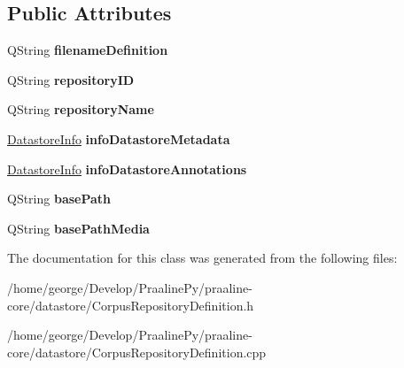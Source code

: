 \subsection*{Public Attributes}
\begin{DoxyCompactItemize}
\item 
\mbox{\label{class_corpus_repository_definition_a4ac448aed041a154050f249672b001c0}} 
Q\+String {\bfseries filename\+Definition}
\item 
\mbox{\label{class_corpus_repository_definition_a811880cb773368317e6aab2245bc2a28}} 
Q\+String {\bfseries repository\+ID}
\item 
\mbox{\label{class_corpus_repository_definition_a5c6950346754c8a150230ac1ce237e0f}} 
Q\+String {\bfseries repository\+Name}
\item 
\mbox{\label{class_corpus_repository_definition_afc1f899f0de59297e36c52a8f757f831}} 
\hyperlink{class_datastore_info}{Datastore\+Info} {\bfseries info\+Datastore\+Metadata}
\item 
\mbox{\label{class_corpus_repository_definition_ae1b4c80d3c6eb40e8c2ec0e8dbdd7d05}} 
\hyperlink{class_datastore_info}{Datastore\+Info} {\bfseries info\+Datastore\+Annotations}
\item 
\mbox{\label{class_corpus_repository_definition_a6fc1aabd138c0645813d36c649e1a06c}} 
Q\+String {\bfseries base\+Path}
\item 
\mbox{\label{class_corpus_repository_definition_abe0b1df1fddcc9b0ab8389af4f592784}} 
Q\+String {\bfseries base\+Path\+Media}
\end{DoxyCompactItemize}


The documentation for this class was generated from the following files\+:\begin{DoxyCompactItemize}
\item 
/home/george/\+Develop/\+Praaline\+Py/praaline-\/core/datastore/Corpus\+Repository\+Definition.\+h\item 
/home/george/\+Develop/\+Praaline\+Py/praaline-\/core/datastore/Corpus\+Repository\+Definition.\+cpp\end{DoxyCompactItemize}
